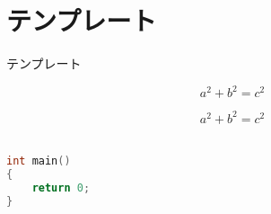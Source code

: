 




\section{テンプレート}

テンプレート

\[a^2+b^2=c^2\]

\begin{equation}
a^2+b^2=c^2
\end{equation}

\begin{align}

\end{align}

\begin{lstlisting}[language=c]
int main()
{
    return 0;
}
\end{lstlisting}

\nocite{*} %



\begin{comment}

\begin{figure}[htbp]
    \centering
    \texttt{[image: plot/graph.pdf]}
    \caption{グラフタイトル}
    \label{fig:graph}
\end{figure}

\begin{figure}[htbp]
    \centering
    \def\svgwidth{200pt}
    {draw.pdf_tex}
    \caption{図タイトル}
    \label{fig:draw}
\end{figure}

\end{comment}



